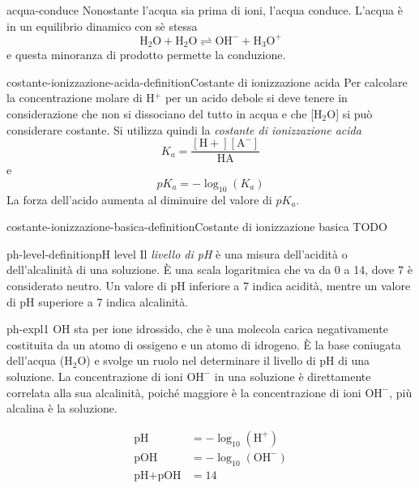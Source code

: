 \documentclass[preview]{standalone}
\begin{document}

\begin{snippet}{acqua-conduce}
    Nonostante l'acqua sia prima di ioni, l'acqua conduce.
    L'acqua è in un equilibrio dinamico con sè stessa
    \[
        \text{H}_2\text{O} + \text{H}_2\text{O} \rightleftharpoons \text{OH}^- + \text{H}_3\text{O}^+
    \]
    e questa minoranza di prodotto permette la conduzione.
\end{snippet}

\begin{snippetdefinition}{costante-ionizzazione-acida-definition}{Costante di ionizzazione acida}
    Per calcolare la concentrazione molare di H\({}^+\) per un acido
    debole si deve tenere in considerazione che non si
    dissociano del tutto in acqua e che [H\({}_2\)O] si può
    considerare costante.
    Si utilizza quindi la \textit{costante di ionizzazione acida}
    \[
        K_a = \frac{[\text{H}+][\text{A}^-]}{\text{HA}}
    \]
    e
    \[
        pK_a=-\log_{10}(K_a)
    \]
    La forza dell'acido aumenta al diminuire del valore di
    \(pK_a\).
\end{snippetdefinition}

\begin{snippetdefinition}{costante-ionizzazione-basica-definition}{Costante di ionizzazione basica}
    TODO
\end{snippetdefinition}

\begin{snippetdefinition}{ph-level-definition}{pH level}
    Il \textit{livello di pH} è una misura dell'acidità o dell'alcalinità di una soluzione.
    È una scala logaritmica che va da 0 a 14, dove 7 è considerato neutro.
    Un valore di pH inferiore a 7 indica acidità, mentre un valore di pH superiore a 7 indica alcalinità.
\end{snippetdefinition}

\begin{snippet}{ph-expl1}
    OH sta per ione idrossido, che è una molecola carica negativamente costituita da un atomo di ossigeno e un atomo di idrogeno.
    È la base coniugata dell'acqua (\(\text{H}_2\text{O}\)) e svolge un ruolo nel determinare il livello di pH di una soluzione.
    La concentrazione di ioni \(\text{OH}^-\) in una soluzione è direttamente correlata alla sua alcalinità,
    poiché maggiore è la concentrazione di ioni \(\text{OH}^-\), più alcalina è la soluzione.

    \begin{align*}
        \text{pH} &= - \log_{10}(\text{H}^+) \\
        \text{pOH} &= - \log_{10}(\text{OH}^-) \\
        \text{pH} + \text{pOH} &= 14 \\
    \end{align*}
    \vspace{-1.25cm}
\end{snippet}
\end{document}
